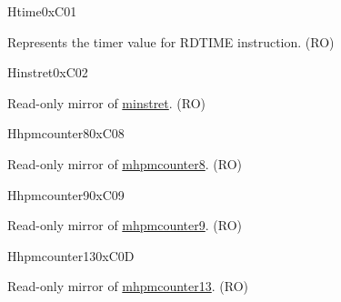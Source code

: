\begin{register}{H}{time}{0xC01}\label{regdesc:TIME}
%
\regnewline%
\begin{regdesc}\begin{reglist}
\label{fielddesc:TIME}\item [TIME] Represents the timer value for RDTIME instruction. (RO)
\end{reglist}\end{regdesc}
\end{register}

\begin{register}{H}{instret}{0xC02}\label{regdesc:INSTRET}
%
\regnewline%
\begin{regdesc}\begin{reglist}
\label{fielddesc:INSTRET}\item [INSTRET] Read-only mirror of \hyperref[regdesc:MINSTRET]{minstret}. (RO)
\end{reglist}\end{regdesc}
\end{register}

\begin{register}{H}{hpmcounter8}{0xC08}\label{regdesc:HPMCOUNTER8}
%
\regnewline%
\begin{regdesc}\begin{reglist}
\label{fielddesc:HPMCOUNTER8}\item [HPMCOUNTER8] Read-only mirror of \hyperref[regdesc:MHPMCOUNTER8]{mhpmcounter8}. (RO)
\end{reglist}\end{regdesc}
\end{register}


\begin{register}{H}{hpmcounter9}{0xC09}\label{regdesc:HPMCOUNTER9}
%
\regnewline%
\begin{regdesc}\begin{reglist}
\label{fielddesc:HPMCOUNTER9}\item [HPMCOUNTER9] Read-only mirror of \hyperref[regdesc:MHPMCOUNTER9]{mhpmcounter9}. (RO)
\end{reglist}\end{regdesc}
\end{register}

\begin{register}{H}{hpmcounter13}{0xC0D}\label{regdesc:HPMCOUNTER13}
%
\regnewline%
\begin{regdesc}\begin{reglist}
\label{fielddesc:HPMCOUNTER13}\item [HPMCOUNTER13] Read-only mirror of \hyperref[regdesc:MHPMCOUNTER13]{mhpmcounter13}. (RO)
\end{reglist}\end{regdesc}
\end{register}


